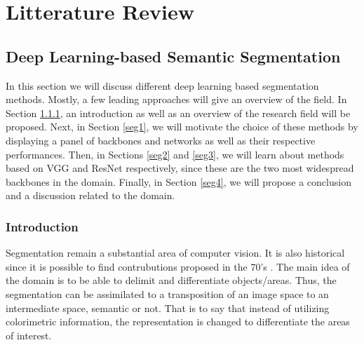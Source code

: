 
\chapter{Litterature Review} %

\label{Chapter2} %





\section{Deep Learning-based Semantic Segmentation}\label{soa-sss}

In this section we will discuss different deep learning based segmentation methods. Mostly, a few leading approaches will give an overview of the field.
In Section \ref{seg-in}, an introduction as well as an overview of the research field will be proposed.
Next, in Section \ref{seg1}, we will motivate the choice of these methods by displaying a panel of backbones and networks as well as their respective performances.
Then, in Sections \ref{seg2} and \ref{seg3}, we will learn about methods based on VGG and ResNet respectively, since these are the two most widespread backbones in the domain.
Finally, in Section \ref{seg4}, we will propose a conclusion and a discussion related to the domain.

\subsection{Introduction}\label{seg-in}

Segmentation remain a substantial area of computer vision. It is also historical since it is possible to find contrubutions proposed in the 70's \cite{ohta1978analysis}. The main idea of the domain is to be able to delimit and differentiate objects/areas. Thus, the segmentation can be assimilated to a transposition of an image space to an intermediate space, semantic or not. That is to say that instead of utilizing colorimetric information, the representation is changed to differentiate the areas of interest.\\

